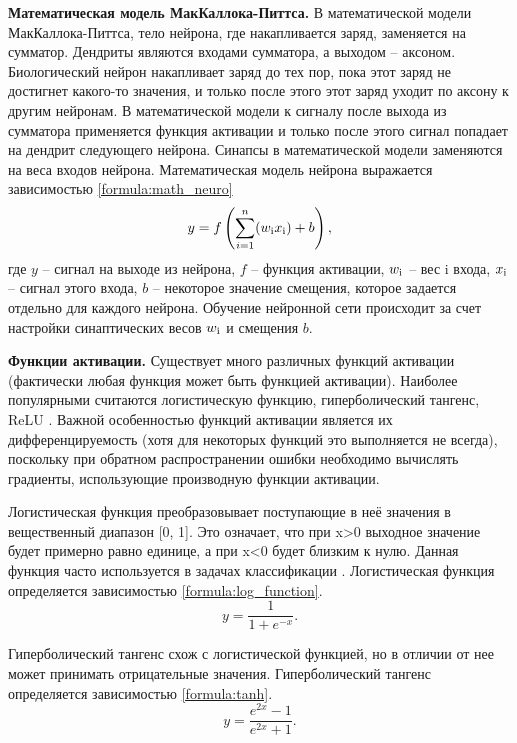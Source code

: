 \textbf{Математическая модель МакКаллока-Питтса.}
В математической модели МакКаллока-Питтса, тело нейрона, где накапливается заряд, заменяется на сумматор. 
Дендриты являются входами сумматора, а выходом -- аксоном. 
Биологический нейрон накапливает заряд до тех пор, пока этот заряд не достигнет какого-то значения, и только после этого этот заряд уходит по аксону к другим нейронам. 
В математической модели к сигналу после выхода из сумматора применяется функция активации и только после этого сигнал попадает на дендрит следующего нейрона. 
Синапсы в математической модели заменяются на веса входов нейрона. 
Математическая модель нейрона выражается зависимостью \ref{formula:math_neuro}
\begin{equation}\label{formula:math_neuro}
y = f\left(\sum\limits_{i = 1}^{n}(w_{\rm{i}}x_{\rm{i}}) + b\right),
\end{equation}
где $y$ -- сигнал на выходе из нейрона, $f$ -- функция активации, $w_{\rm{i}}$ -- вес i входа, $x_{\rm{i}}$ -- сигнал этого входа, $b$ -- некоторое значение смещения, которое задается отдельно для каждого нейрона.
Обучение нейронной сети происходит за счет настройки синаптических весов $w_{\rm{i}}$ и смещения $b$.

\textbf{Функции активации.}
Существует много различных функций активации (фактически любая функция может быть функцией активации).
Наиболее популярными считаются логистическую функцию, гиперболический тангенс, ReLU \cite{activation_function}. Важной особенностью функций активации является их дифференцируемость (хотя для некоторых функций это выполняется не всегда), поскольку при обратном распространении ошибки необходимо вычислять градиенты, использующие производную функции активации.

Логистическая функция преобразовывает поступающие в неё значения в вещественный диапазон [0, 1]. 
Это означает, что при x>0 выходное значение будет примерно равно единице, а при x<0 будет близким к нулю. 
Данная функция часто используется в задачах классификации \cite{activation_function}. 
Логистическая функция определяется зависимостью \ref{formula:log_function}.
\begin{equation}\label{formula:log_function}
y = \frac{1}{1 + e^{-x}}.
\end{equation}

Гиперболический тангенс схож с логистической функцией, но в отличии от нее может принимать отрицательные значения. 
Гиперболический тангенс определяется зависимостью \ref{formula:tanh}.
\begin{equation}\label{formula:tanh}
y = \frac{e^{2x} - 1}{e^{2x} + 1}.
\end{equation}

